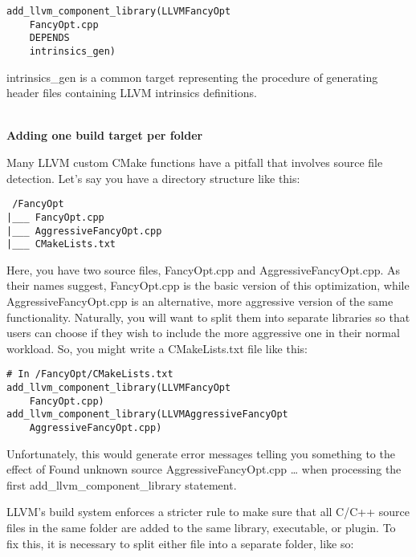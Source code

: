 \begin{lstlisting}[style=styleCMake]
add_llvm_component_library(LLVMFancyOpt
	FancyOpt.cpp
	DEPENDS
	intrinsics_gen)
\end{lstlisting}

intrinsics\_gen is a common target representing the procedure of generating header files containing LLVM intrinsics definitions.

\hspace*{\fill} \\
\noindent
\textbf{Adding one build target per folder}

Many LLVM custom CMake functions have a pitfall that involves source file detection. Let's say you have a directory structure like this:

\begin{tcolorbox}[colback=white,colframe=black]
\tt
/FancyOpt \\
\hspace*{0.5cm}|\_\_\_ FancyOpt.cpp \\
\hspace*{0.5cm}|\_\_\_ AggressiveFancyOpt.cpp \\
\hspace*{0.5cm}|\_\_\_ CMakeLists.txt
\end{tcolorbox}

Here, you have two source files, FancyOpt.cpp and AggressiveFancyOpt.cpp. As their names suggest, FancyOpt.cpp is the basic version of this optimization, while AggressiveFancyOpt.cpp is an alternative, more aggressive version of the same functionality. Naturally, you will want to split them into separate libraries so that users can choose if they wish to include the more aggressive one in their normal workload. So, you might write a CMakeLists.txt file like this:

\begin{lstlisting}[style=styleCMake]
# In /FancyOpt/CMakeLists.txt
add_llvm_component_library(LLVMFancyOpt
	FancyOpt.cpp)
add_llvm_component_library(LLVMAggressiveFancyOpt
	AggressiveFancyOpt.cpp)
\end{lstlisting}

Unfortunately, this would generate error messages telling you something to the effect of Found unknown source AggressiveFancyOpt.cpp … when processing the first add\_llvm\_component\_library statement.

LLVM's build system enforces a stricter rule to make sure that all C/C++ source files in the same folder are added to the same library, executable, or plugin. To fix this, it is necessary to split either file into a separate folder, like so:


